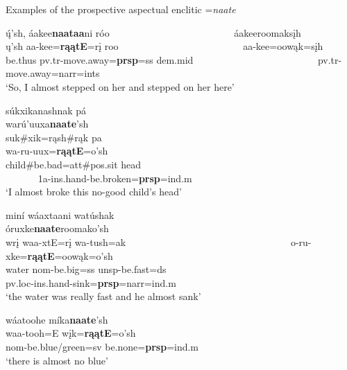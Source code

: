 \begin{exe}

\item\label{prospectiveaspectual} Examples of the prospective aspectual enclitic =\textit{naate}

	\begin{xlist}
	
	\item\label{prospectiveaspectual1} 
	\glll ų́'sh, áakee\textbf{naataa}ni róo ~ ~ ~ ~ ~ ~ ~ ~ ~ ~ ~ ~ ~ ~ ~  áakeeroomaksįh\\
	ų'sh aa-kee=\textbf{rąątE}=rį roo ~ ~ ~ ~ ~ ~ ~ ~ ~ ~ ~ ~ ~ ~ ~  aa-kee=oowąk=sįh\\
	\textnormal{be.thus} pv.tr-\textnormal{move.away}=\textbf{prsp}=ss dem.mid ~ ~ ~ ~ ~ ~ ~ ~ ~ ~ ~ ~ ~ ~ ~ pv.tr-\textnormal{move.away}=narr=ints\\
	\glt `So, I almost stepped on her and stepped on her here' \citep[71]{hollow1973a}

	\item\label{prospectiveaspectual2} 
	\glll súkxikanashnak pá ~ ~ ~ ~ ~ ~ ~ ~ ~ ~ ~ ~ ~ ~ ~ ~ ~ ~ ~ ~ ~ ~ ~ ~ ~ ~ ~ ~ ~ ~ warú'uuxa\textbf{naate}'sh\\
	suk\#xik=rąsh\#rąk pa ~ ~ ~ ~ ~ ~ ~ ~ ~ ~ ~ ~ ~ ~ ~ ~ ~ ~ ~ ~ ~ ~ ~ ~ ~ ~ ~ ~ ~ ~ wa-ru-uux=\textbf{rąątE}=o'sh\\
	\textnormal{child}\#\textnormal{be.bad}=att\#pos.sit \textnormal{head} ~ ~ ~ ~ ~ ~ ~ ~ ~ ~ ~ ~ ~ ~ ~ ~ ~ ~ ~ ~ ~ ~ ~ ~ ~ ~ ~ ~ ~ ~ 1a-ins.hand-\textnormal{be.broken}=\textbf{prsp}=ind.m\\
	\glt `I almost broke this no-good child's head' \citep[158]{hollow1973b}
	
	\item\label{prospectiveaspectual3}
	\glll miní wáaxtaani watúshak ~ ~ ~ ~ ~ ~ ~ ~ ~ ~ ~ ~ ~ ~ ~ ~ ~ ~ ~ ~  óruxke\textbf{naate}roomako'sh\\
	wrį waa-xtE=rį wa-tush=ak ~ ~ ~ ~ ~ ~ ~ ~ ~ ~ ~ ~ ~ ~ ~ ~ ~ ~ ~ ~  o-ru-xke=\textbf{rąątE}=oowąk=o'sh\\
	\textnormal{water} nom-\textnormal{be.big}=ss unsp-\textnormal{be.fast}=ds ~ ~ ~ ~ ~ ~ ~ ~ ~ ~ ~ ~ ~ ~ ~ ~ ~ ~ ~ ~  pv.loc-ins.hand-\textnormal{sink}=\textbf{prsp}=narr=ind.m\\
	\glt `the water was really fast and he almost sank' \citep[296]{hollow1973b}

	\item\label{prospectiveaspectual4}
	\glll wáatoohe míka\textbf{naate}'sh\\
	waa-tooh=E wįk=\textbf{rąątE}=o'sh\\
	nom-\textnormal{be.blue/green}=sv \textnormal{be.none}=\textbf{prsp}=ind.m\\
	\glt `there is almost no blue' \citep[468]{hollow1970}


\end{xlist}
\end{exe}

